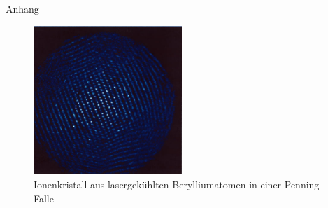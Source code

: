 \documentclass[12pt,xcolor=dvipsnames]{beamer}
\begin{document}
\begin{frame}{Anhang}
	\begin{figure}
		\includegraphics[width=0.5\textwidth]{./figures/ionenkristall.png}
		\caption{Ionenkristall aus lasergekühlten Berylliumatomen in einer Penning-Falle \cite{wpw}}
	\end{figure}
\end{frame}
\end{document}
